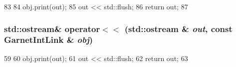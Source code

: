 \begin{DoxyCode}
83 {
84     obj.print(out);
85     out << std::flush;
86     return out;
87 }
\end{DoxyCode}
\hypertarget{GarnetLink_8hh_aef8b8ae4c91965d9642157fd986a34e3}{
\subsubsection[{operator$<$$<$}]{\setlength{\rightskip}{0pt plus 5cm}std::ostream\& operator$<$$<$ (std::ostream \& {\em out}, \/  const {\bf GarnetIntLink} \& {\em obj})}}
\label{GarnetLink_8hh_aef8b8ae4c91965d9642157fd986a34e3}



\begin{DoxyCode}
59 {
60     obj.print(out);
61     out << std::flush;
62     return out;
63 }
\end{DoxyCode}
